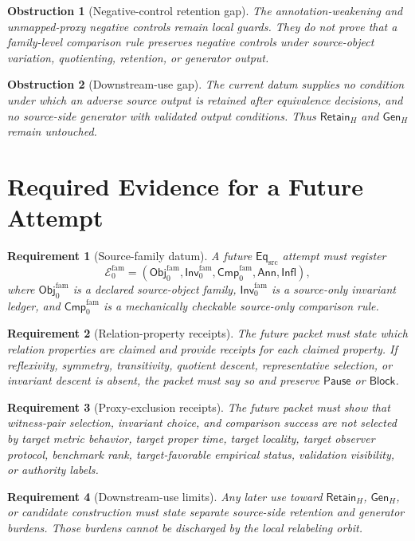 \documentclass[11pt]{article}
\newcommand{\ObjFam}{\mathsf{Obj}_{0}^{\mathrm{fam}}}
\newcommand{\InvFam}{\mathsf{Inv}_{0}^{\mathrm{fam}}}
\newcommand{\CmpFam}{\mathsf{Cmp}_{0}^{\mathrm{fam}}}
\newcommand{\EqSrc}{\mathsf{Eq}_{\mathrm{src}}}
\newcommand{\GenH}{\mathsf{Gen}_{H}}
\newcommand{\RetainH}{\mathsf{Retain}_{H}}
\newcommand{\Annot}{\mathsf{Ann}}
\newcommand{\Influence}{\mathsf{Infl}}
\newcommand{\Block}{\mathsf{Block}}
\newcommand{\Pause}{\mathsf{Pause}}
\newtheorem{obstruction}{Obstruction}
\newtheorem{requirement}{Requirement}
\begin{document}
\begin{obstruction}[Negative-control retention gap]
The annotation-weakening and unmapped-proxy negative controls remain local
guards. They do not prove that a family-level comparison rule preserves
negative controls under source-object variation, quotienting, retention,
or generator output.
\end{obstruction}

\begin{obstruction}[Downstream-use gap]
The current datum supplies no condition under which an adverse source
output is retained after equivalence decisions, and no source-side
generator with validated output conditions. Thus \(\RetainH\) and
\(\GenH\) remain untouched.
\end{obstruction}

\section{Required Evidence for a Future Attempt}

\begin{requirement}[Source-family datum]
A future \(\EqSrc\) attempt must register
\[
    \mathcal{E}_{0}^{\mathrm{fam}} =
    (\ObjFam,\InvFam,\CmpFam,\Annot,\Influence),
\]
where \(\ObjFam\) is a declared source-object family, \(\InvFam\) is a
source-only invariant ledger, and \(\CmpFam\) is a mechanically checkable
source-only comparison rule.
\end{requirement}

\begin{requirement}[Relation-property receipts]
The future packet must state which relation properties are claimed and
provide receipts for each claimed property. If reflexivity, symmetry,
transitivity, quotient descent, representative selection, or invariant
descent is absent, the packet must say so and preserve \(\Pause\) or
\(\Block\).
\end{requirement}

\begin{requirement}[Proxy-exclusion receipts]
The future packet must show that witness-pair selection, invariant choice,
and comparison success are not selected by target metric behavior, target
proper time, target locality, target observer protocol, benchmark rank,
target-favorable empirical status, validation visibility, or authority
labels.
\end{requirement}

\begin{requirement}[Downstream-use limits]
Any later use toward \(\RetainH\), \(\GenH\), or candidate construction
must state separate source-side retention and generator burdens. Those
burdens cannot be discharged by the local relabeling orbit.
\end{requirement}
\end{document}
